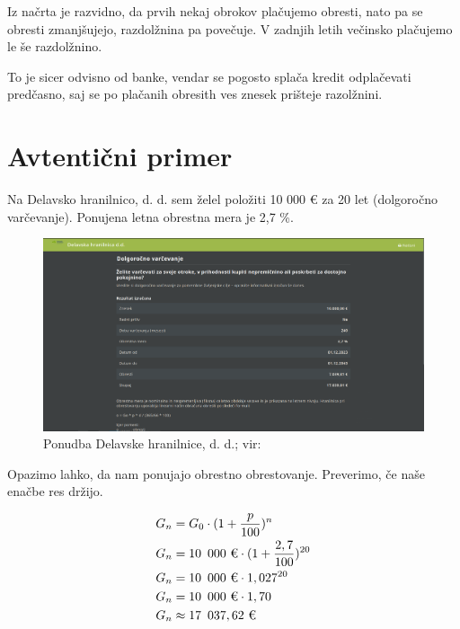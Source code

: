 \documentclass[12pt]{article}
\begin{document}
    Iz načrta je razvidno, da prvih nekaj obrokov plačujemo obresti, nato pa se obresti
    zmanjšujejo, razdolžnina pa povečuje. V zadnjih letih večinsko plačujemo le še razdolžnino.

    To je sicer odvisno od banke, vendar se pogosto splača kredit odplačevati predčasno, saj
    se po plačanih obresith ves znesek prišteje razolžnini. 
    \newpage

\section{Avtentični primer}
    Na Delavsko hranilnico, d. d. sem želel položiti 10 000 € za 20 let (dolgoročno varčevanje).
    Ponujena letna obrestna mera je 2,7 \%. \\

    \begin{figure}[h!]
        \includegraphics[width=\textwidth]{slike/2023-11-28_18-36.png}
        \caption{Ponudba Delavske hranilnice, d. d.; vir: \cite{DH}}
    \end{figure}

    Opazimo lahko, da nam ponujajo obrestno obrestovanje. Preverimo, če naše enačbe res držijo.

    \begin{equation}
        \begin{split}
            G_n & = G_0 \cdot (1 + \frac{p}{100})^n \\
            G_n & = 10 \enskip 000 \text{ €} \cdot (1 + \frac{2,7}{100})^{20} \\
            G_n & = 10 \enskip 000 \text{ €} \cdot 1,027^{20} \\
            G_n & = 10 \enskip 000 \text{ €} \cdot 1,70 \\
            G_n & \approx 17 \enskip 037,62 \text{ €}
        \end{split}
    \end{equation}
\end{document}
